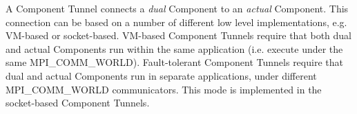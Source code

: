 %


A Component Tunnel connects a {\em dual} Component to an {\em actual} Component. This connection can be based on a number of different low level implementations, e.g. VM-based or socket-based. VM-based Component Tunnels require that both dual and actual Components run within the same application (i.e. execute under the same MPI\_COMM\_WORLD). Fault-tolerant Component Tunnels require that dual and actual Components run in separate applications, under different MPI\_COMM\_WORLD communicators. This mode is implemented in the socket-based Component Tunnels.
